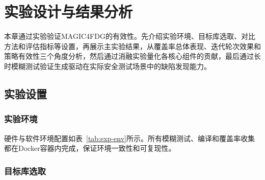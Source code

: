 \chapter{实验设计与结果分析}

本章通过实验验证MAGIC4FDG的有效性。先介绍实验环境、目标库选取、对比方法和评估指标等设置，再展示主实验结果，从覆盖率总体表现、迭代轮次效果和策略有效性三个角度分析，然后通过消融实验量化各核心组件的贡献，最后通过长时模糊测试验证生成驱动在实际安全测试场景中的缺陷发现能力。

\section{实验设置}

\subsection{实验环境}

硬件与软件环境配置如表~\ref{tab:exp-env}所示。所有模糊测试、编译和覆盖率收集都在Docker容器内完成，保证环境一致性和可复现性。

\begin{table}[H]
    \centering
    \caption{实验环境配置}
    \label{tab:exp-env}
\end{table}

\subsection{目标库选取}

